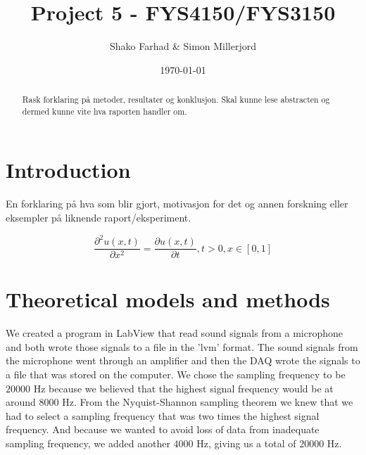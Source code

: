 \documentclass[english,a4paper,12pt]{article}
\title{Project 5 - FYS4150/FYS3150}
\author{Shako Farhad \& Simon Millerjord}
\date{\today}
\begin{document}
 
 
\lstset{style=mystyle}

\maketitle

\begin{abstract}
Rask forklaring på metoder, resultater og konklusjon. Skal kunne lese abstracten og dermed kunne vite hva raporten handler om.
\end{abstract}

\section*{Introduction}
En forklaring på hva som blir gjort, motivasjon for det og annen forskning eller eksempler på liknende raport/eksperiment.\\ \bigskip

\begin{equation} \label{eq:1D-Diffusion}
 \frac{\partial^2 u(x,t)}{\partial x^2} =\frac{\partial u(x,t)}{\partial t}, t> 0, x\in [0,1]
\end{equation}

\section*{Theoretical models and methods}
We created a program in LabView that read sound signals from a microphone and both wrote those signals to a file in the 'lvm' format. The sound signals from the microphone went through an amplifier and then the DAQ wrote the signals to a file that was stored on the computer. We chose the sampling frequency to be $20000$ Hz because we believed that the highest signal frequency would be at around $8000$ Hz. From the Nyquist-Shannon sampling theorem we knew that we had to select a sampling frequency that was two times the highest signal frequency. And because we wanted to avoid loss of data from inadequate sampling frequency, we added another $4000$ Hz, giving us a total of $20000$ Hz. \bigskip
\end{document}
